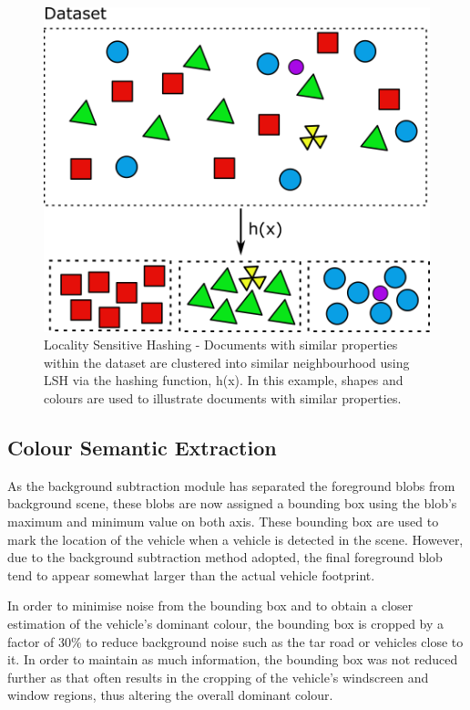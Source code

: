 \begin{figure}[hbt!]\centering
\includegraphics[width=.7\textwidth]{image/new/lsh.png}
\caption{Locality Sensitive Hashing - Documents with similar properties within the dataset are clustered into similar neighbourhood using LSH via the hashing function, h(x). In this example, shapes and colours are used to illustrate documents with similar properties.}
\label{fig:lshexample}
\end{figure}



\subsection{Colour Semantic Extraction }
\label{section:versionOneColorExtract}

As the background subtraction module has separated the foreground blobs from background scene, these blobs are now assigned a bounding box using the blob's maximum and minimum value on both axis. These bounding box are used to mark the location of the vehicle when a vehicle is detected in the scene. However, due to the background subtraction method adopted, the final foreground blob tend to appear somewhat larger than the actual vehicle footprint. 

In order to minimise noise from the bounding box and to obtain a closer estimation of the vehicle's dominant colour, the bounding box is cropped by a factor of 30\% to reduce background noise such as the tar road or vehicles close to it. In order to maintain as much information, the bounding box was not reduced further as that often results in the cropping of the vehicle's windscreen and window regions, thus altering the overall dominant colour.

